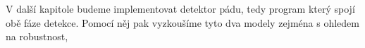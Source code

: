 V další kapitole budeme implementovat detektor pádu, tedy program který spojí
obě fáze detekce. Pomocí něj pak vyzkoušíme tyto dva modely zejména s ohledem
na robustnost,
%
%
%
%
%
%
%
%
%
%
%
%
%
%
%
%



